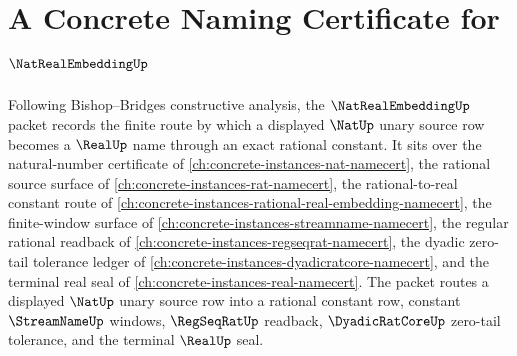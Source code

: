 \chapter{A Concrete Naming Certificate for $\NatRealEmbeddingUp$}
\label{ch:concrete-instances-nat-real-embedding-namecert}

Following Bishop--Bridges constructive analysis, the $\NatRealEmbeddingUp$ packet records the finite route by which a displayed $\NatUp$ unary source row becomes a $\RealUp$ name through an exact rational constant. It sits over the natural-number certificate of \autoref{ch:concrete-instances-nat-namecert}, the rational source surface of \autoref{ch:concrete-instances-rat-namecert}, the rational-to-real constant route of \autoref{ch:concrete-instances-rational-real-embedding-namecert}, the finite-window surface of \autoref{ch:concrete-instances-streamname-namecert}, the regular rational readback of \autoref{ch:concrete-instances-regseqrat-namecert}, the dyadic zero-tail tolerance ledger of \autoref{ch:concrete-instances-dyadicratcore-namecert}, and the terminal real seal of \autoref{ch:concrete-instances-real-namecert}. The packet routes a displayed $\NatUp$ unary source row into a rational constant row, constant $\StreamNameUp$ windows, $\RegSeqRatUp$ readback, $\DyadicRatCoreUp$ zero-tail tolerance, and the terminal $\RealUp$ seal.

